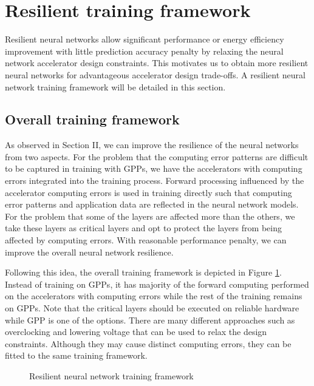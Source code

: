 \section{Resilient training framework} \label{sec:framework}
Resilient neural networks allow significant performance or 
energy efficiency improvement with little prediction accuracy penalty 
by relaxing the neural network accelerator design constraints. 
This motivates us to obtain more resilient neural networks 
for advantageous accelerator design trade-offs. 
A resilient neural network training framework will be 
detailed in this section. 

\subsection{Overall training framework}
As observed in Section II, we can improve the resilience of 
the neural networks from two aspects. For the problem that the 
computing error patterns are difficult to be captured in training with GPPs, 
we have the accelerators with computing errors integrated into 
the training process. Forward processing influenced by 
the accelerator computing errors is used in training directly 
such that computing error patterns and application data are 
reflected in the neural network models. For the problem that 
some of the layers are affected more than the others, 
we take these layers as critical layers and opt to 
protect the layers from being affected by computing errors. 
With reasonable performance penalty, we can improve the 
overall neural network resilience. 

Following this idea, the overall training framework is depicted in Figure \ref{fig:retrain}. 
Instead of training on GPPs, it has majority of the forward computing performed on the 
accelerators with computing errors while the rest of the training remains on GPPs.
Note that the critical layers should be executed on reliable hardware 
while GPP is one of the options. There are many different approaches 
such as overclocking and lowering voltage that can be used to relax the design constraints.
Although they may cause distinct computing errors, they can be fitted to the 
same training framework.


\begin{figure}
        \caption{Resilient neural network training framework}
        \label{fig:retrain}
\end{figure}



